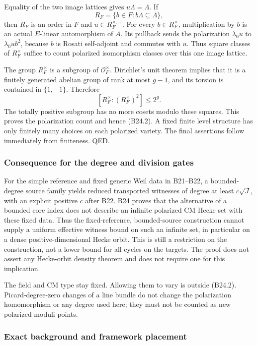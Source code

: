 \documentclass[11pt,a4paper]{article}
\theoremstyle{definition}
\begin{document}
Equality of the two image lattices gives \(u\Lambda=\Lambda\). If \[
 R_F=\{b\in F:b\Lambda\subseteq\Lambda\},
\] then \(R_F\) is an order in \(F\) and \(u\in R_F^{\times,+}\). For
every \(b\in R_F^\times\), multiplication by \(b\) is an actual
\(E\)-linear automorphism of \(A\). Its pullback sends the polarization
\(\lambda_0u\) to \(\lambda_0ub^2\), because \(b\) is Rosati
self-adjoint and commutes with \(u\). Thus square classes of
\(R_F^\times\) suffice to count polarized isomorphism classes over this
one image lattice.

The group \(R_F^\times\) is a subgroup of \(\mathcal O_F^\times\).
Dirichlet's unit theorem implies that it is a finitely generated abelian
group of rank at most \(g-1\), and its torsion is contained in
\(\{1,-1\}\). Therefore \[
 [R_F^\times:(R_F^\times)^2]\le2^g.
\] The totally positive subgroup has no more cosets modulo these
squares. This proves the polarization count and hence (B24.2). A fixed
finite level structure has only finitely many choices on each polarized
variety. The final assertions follow immediately from finiteness. QED.

\subsubsection{Consequence for the degree and division
gates}\label{bounded-core-moduli-consequence-for-the-degree-and-division-gates}

For the simple reference and fixed generic Weil data in B21--B22, a
bounded-degree source family yields reduced transported witnesses of
degree at least \(c\sqrt J\), with an explicit positive \(c\) after B22.
B24 proves that the alternative of a bounded core index does not
describe an infinite polarized CM Hecke set with these fixed data. Thus
the fixed-reference, bounded-source construction cannot supply a uniform
effective witness bound on such an infinite set, in particular on a
dense positive-dimensional Hecke orbit. This is still a restriction on
the construction, not a lower bound for all cycles on the targets. The
proof does not assert any Hecke-orbit density theorem and does not
require one for this implication.

The field and CM type stay fixed. Allowing them to vary is outside
(B24.2). Picard-degree-zero changes of a line bundle do not change the
polarization homomorphism or any degree used here; they must not be
counted as new polarized moduli points.

\subsubsection{Exact background and framework
placement}\label{bounded-core-moduli-exact-background-and-framework-placement}
\end{document}
